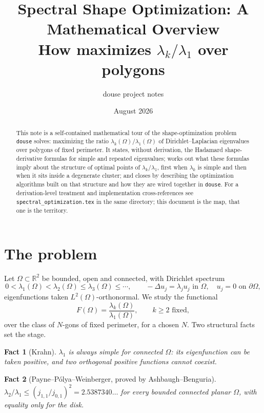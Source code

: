 \documentclass[11pt]{article}
\title{Spectral Shape Optimization: A Mathematical Overview\\
\large How \code{douse} maximizes $\lambda_k/\lambda_1$ over polygons}
\author{douse project notes}
\date{August 2026}
\newcommand{\Om}{\Omega}
\newcommand{\bd}{\partial\Omega}
\newcommand{\code}[1]{\texttt{#1}}
\newcommand{\R}{\mathbb{R}}
\theoremstyle{plain}
\newtheorem{fact}{Fact}
\begin{document}
\maketitle

\begin{abstract}
This note is a self-contained mathematical tour of the shape-optimization problem \code{douse}
solves: maximizing the ratio $\lambda_k(\Om)/\lambda_1(\Om)$ of Dirichlet--Laplacian eigenvalues
over polygons of fixed perimeter. It states, without derivation, the Hadamard shape-derivative
formulas for simple and repeated eigenvalues; works out what these formulas imply about the
structure of optimal points of $\lambda_k/\lambda_1$, first when $\lambda_k$ is simple and then
when it sits inside a degenerate cluster; and closes by describing the optimization algorithms
built on that structure and how they are wired together in \code{douse}. For a derivation-level
treatment and implementation cross-references see \code{spectral\_optimization.tex} in the same
directory; this document is the map, that one is the territory.
\end{abstract}

\tableofcontents

\section{The problem}

Let $\Om\subset\R^2$ be bounded, open and connected, with Dirichlet spectrum
\[
  0<\lambda_1(\Om)<\lambda_2(\Om)\le\lambda_3(\Om)\le\cdots,\qquad
  -\Delta u_j=\lambda_j u_j \text{ in }\Om,\quad u_j=0\text{ on }\bd,
\]
eigenfunctions taken $L^2(\Om)$-orthonormal. We study the functional
\begin{equation}\label{eq:F}
  F(\Om)=\frac{\lambda_k(\Om)}{\lambda_1(\Om)},\qquad k\ge2\text{ fixed},
\end{equation}
over the class of $N$-gons of fixed perimeter, for a chosen $N$. Two structural facts set the
stage.

\begin{fact}[Krahn]\label{fact:krahn}
$\lambda_1$ is always simple for connected $\Om$: its eigenfunction can be taken positive, and two
orthogonal positive functions cannot coexist.
\end{fact}

\begin{fact}[Payne--P\'olya--Weinberger, proved by Ashbaugh--Benguria]\label{fact:ppw}
$\lambda_2/\lambda_1\le(j_{1,1}/j_{0,1})^2=2.5387340\ldots$ for every bounded connected planar
$\Om$, with equality only for the disk.
\end{fact}
\end{document}
